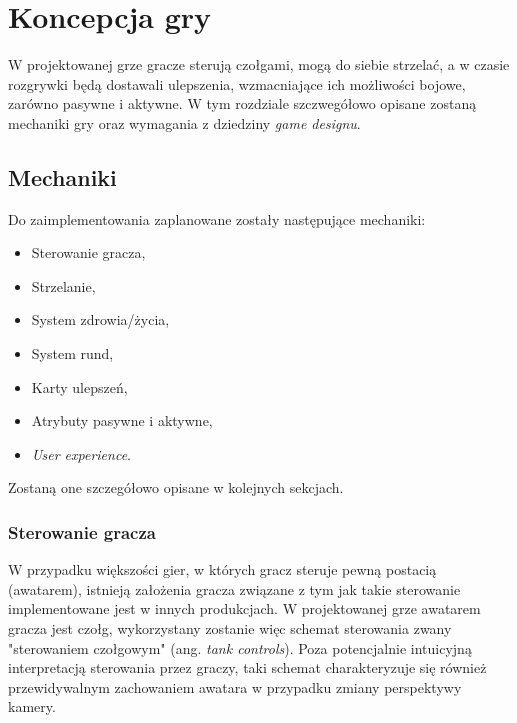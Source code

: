\chapter{Koncepcja gry}
\cite{game_engine_architecture}
W projektowanej grze gracze sterują czołgami, mogą do siebie strzelać, a w czasie rozgrywki będą dostawali ulepszenia, wzmacniające ich możliwości bojowe, zarówno pasywne i aktywne.
W tym rozdziale szczwegółowo opisane zostaną mechaniki gry oraz wymagania z dziedziny \emph{game designu}.

\section{Mechaniki}\label{sec:mechanics_concept}

Do zaimplementowania zaplanowane zostały następujące mechaniki:

\begin{itemize}
    \item Sterowanie gracza,
    \item Strzelanie,
    \item System zdrowia/życia,
    \item System rund,
    \item Karty ulepszeń,
    \item Atrybuty pasywne i aktywne,
    \item \emph{User experience}.
\end{itemize}

Zostaną one szczegółowo opisane w kolejnych sekcjach.



\subsection{Sterowanie gracza}\label{sec:steering_concept}

W przypadku większości gier, w których gracz steruje pewną postacią (awatarem), istnieją założenia gracza związane z tym jak takie sterowanie implementowane jest w innych produkcjach.
W projektowanej grze awatarem gracza jest czołg, wykorzystany zostanie więc schemat sterowania zwany "sterowaniem czołgowym" (ang. \emph{tank controls}). \cite{horror_tank_controls}
Poza potencjalnie intuicyjną interpretacją sterowania przez graczy, taki schemat charakteryzuje się również przewidywalnym zachowaniem awatara w przypadku zmiany perspektywy kamery.

